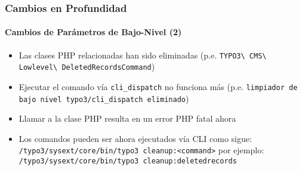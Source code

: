 \begin{frame}[fragile]
	\frametitle{Cambios en Profundidad}
	\framesubtitle{Cambios de Parámetros de Bajo-Nivel (2)}


	\begin{itemize}
		\item Las clases PHP relacionadas han sido eliminadas\newline
			\smaller(p.e. \texttt{TYPO3\textbackslash
				CMS\textbackslash
				Lowlevel\textbackslash
				DeletedRecordsCommand})
			\normalsize

		\item Ejecutar el comando vía \texttt{cli\_dispatch} no funciona más\newline
			\smaller(p.e. \texttt{limpiador de bajo nivel typo3/cli\_dispatch eliminado})\normalsize
		\item Llamar a la clase PHP resulta en un error PHP fatal ahora

		\item Los comandos pueden ser ahora ejecutados vía CLI como sigue:\newline
			\smaller\texttt{/typo3/sysext/core/bin/typo3 cleanup:<command>}\normalsize\newline
			por ejemplo:\newline
			\smaller\texttt{/typo3/sysext/core/bin/typo3 cleanup:deletedrecords}\normalsize

	\end{itemize}

\end{frame}





